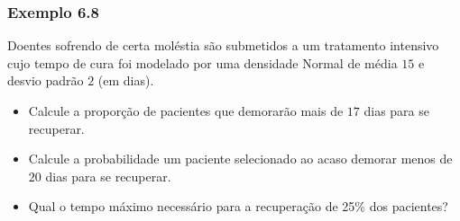 \documentclass[11pt]{beamer}
\begin{document}
\begin{frame}
\frametitle{Exemplo 6.8}

Doentes sofrendo de certa moléstia são submetidos a um tratamento
intensivo cujo tempo de cura foi modelado por uma densidade Normal de
média \(15\) e desvio padrão \(2\) (em dias).

\begin{itemize}
\item
  Calcule a proporção de pacientes que demorarão mais de \(17\) dias
  para se recuperar.
\item
  Calcule a probabilidade um paciente selecionado ao acaso demorar menos
  de \(20\) dias para se recuperar.
\item
  Qual o tempo máximo necessário para a recuperação de 25\% dos
  pacientes?

\end{itemize}
\end{frame}
\end{document}
